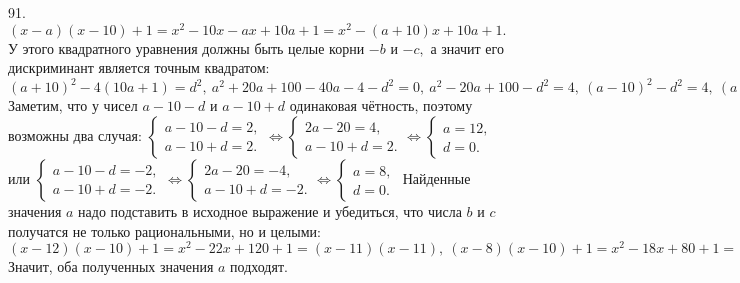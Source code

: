 91. $(x-a)(x-10)+1=x^2-10x-ax+10a+1=x^2-(a+10)x+10a+1.$ У этого квадратного уравнения должны быть целые корни $-b$ и $-c,$ а значит его дискриминант является точным квадратом: $(a+10)^2-4(10a+1)=d^2,\ a^2+20a+100-40a-4-d^2=0,\
a^2-20a+100-d^2=4,\ (a-10)^2-d^2=4,\ (a-10-d)(a-10+d)=4.$ Заметим, что у чисел $a-10-d$ и $a-10+d$ одинаковая чётность, поэтому возможны два случая: $\begin{cases} a-10-d=2,\\ a-10+d=2. \end{cases}\Leftrightarrow \begin{cases} 2a-20=4,\\ a-10+d=2. \end{cases}\Leftrightarrow \begin{cases} a=12,\\ d=0.\end{cases}$ или
$\begin{cases} a-10-d=-2,\\ a-10+d=-2. \end{cases}\Leftrightarrow \begin{cases} 2a-20=-4,\\ a-10+d=-2. \end{cases}\Leftrightarrow \begin{cases} a=8,\\ d=0.\end{cases}$
Найденные значения $a$ надо подставить в исходное выражение и убедиться, что числа $b$ и $c$ получатся не только рациональными, но и целыми:
$(x-12)(x-10)+1=x^2-22x+120+1=(x-11)(x-11),\ (x-8)(x-10)+1=x^2-18x+80+1=(x-9)(x-9).$ Значит, оба полученных значения $a$ подходят.\\
